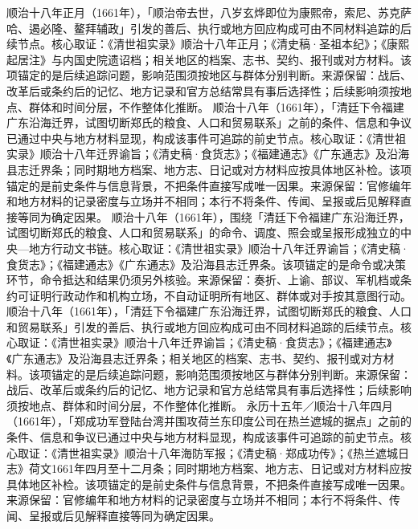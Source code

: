 顺治十八年正月（1661年），「顺治帝去世，八岁玄烨即位为康熙帝，索尼、苏克萨哈、遏必隆、鳌拜辅政」引发的善后、执行或地方回应构成可由不同材料追踪的后续节点。核心取证：《清世祖实录》顺治十八年正月；《清史稿·圣祖本纪》；《康熙起居注》与内国史院遗诏档；相关地区的档案、志书、契约、报刊或对方材料。该项锚定的是后续追踪问题，影响范围须按地区与群体分别判断。来源保留：战后、改革后或条约后的记忆、地方记录和官方总结常具有事后选择性；后续影响须按地点、群体和时间分层，不作整体化推断。
顺治十八年（1661年），「清廷下令福建广东沿海迁界，试图切断郑氏的粮食、人口和贸易联系」之前的条件、信息和争议已通过中央与地方材料显现，构成该事件可追踪的前史节点。核心取证：《清世祖实录》顺治十八年迁界谕旨；《清史稿·食货志》；《福建通志》《广东通志》及沿海县志迁界条；同时期地方档案、地方志、日记或对方材料应按具体地区补检。该项锚定的是前史条件与信息背景，不把条件直接写成唯一因果。来源保留：官修编年和地方材料的记录密度与立场并不相同；本行不将条件、传闻、呈报或后见解释直接等同为确定因果。
顺治十八年（1661年），围绕「清廷下令福建广东沿海迁界，试图切断郑氏的粮食、人口和贸易联系」的命令、调度、照会或呈报形成独立的中央—地方行动文书链。核心取证：《清世祖实录》顺治十八年迁界谕旨；《清史稿·食货志》；《福建通志》《广东通志》及沿海县志迁界条。该项锚定的是命令或决策环节，命令抵达和结果仍须另外核验。来源保留：奏折、上谕、部议、军机档或条约可证明行政动作和机构立场，不自动证明所有地区、群体或对手按其意图行动。
顺治十八年（1661年），「清廷下令福建广东沿海迁界，试图切断郑氏的粮食、人口和贸易联系」引发的善后、执行或地方回应构成可由不同材料追踪的后续节点。核心取证：《清世祖实录》顺治十八年迁界谕旨；《清史稿·食货志》；《福建通志》《广东通志》及沿海县志迁界条；相关地区的档案、志书、契约、报刊或对方材料。该项锚定的是后续追踪问题，影响范围须按地区与群体分别判断。来源保留：战后、改革后或条约后的记忆、地方记录和官方总结常具有事后选择性；后续影响须按地点、群体和时间分层，不作整体化推断。
永历十五年／顺治十八年四月（1661年），「郑成功军登陆台湾并围攻荷兰东印度公司在热兰遮城的据点」之前的条件、信息和争议已通过中央与地方材料显现，构成该事件可追踪的前史节点。核心取证：《清世祖实录》顺治十八年海防军报；《清史稿·郑成功传》；《热兰遮城日志》荷文1661年四月至十二月条；同时期地方档案、地方志、日记或对方材料应按具体地区补检。该项锚定的是前史条件与信息背景，不把条件直接写成唯一因果。来源保留：官修编年和地方材料的记录密度与立场并不相同；本行不将条件、传闻、呈报或后见解释直接等同为确定因果。
